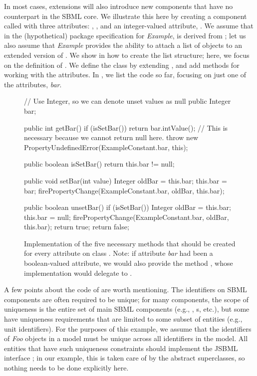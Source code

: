 In most cases, extensions will also introduce new components that have no
counterpart in the SBML core.  We illustrate this here by creating a
component called  with three attributes: , ,
and an integer-valued attribute, .  We assume that in the
(hypothetical) package specification for \emph{Example},  is
derived from \SBase; let us also assume that \emph{Example} provides the
ability to attach a list of  objects to an extended version of
\Model.  We show in  how to create the list
structure; here, we focus on the definition of .  We define the
class  by extending \AbstractSBasePlugin, and add methods for
working with the attributes.  In ,
we list the code so far, focusing on just one of the attributes,
\emph{bar}.

\begin{figure}[hbt]
  \begin{example}[numbers=left]
// Use Integer, so we can denote unset values as null public Integer bar;

public int getBar() {
  if (isSetBar()) {
    return bar.intValue();
  }
  // This is necessary because we cannot return null here.
  throw new PropertyUndefinedError(ExampleConstant.bar, this);
}

public boolean isSetBar() {
  return this.bar != null;
}

public void setBar(int value) {
  Integer oldBar = this.bar;
  this.bar = bar;
  firePropertyChange(ExampleConstant.bar, oldBar, this.bar);
}

public boolean unsetBar() {
  if (isSetBar()) {
    Integer oldBar = this.bar;
    this.bar = null;
    firePropertyChange(ExampleConstant.bar, oldBar, this.bar);
    return true;
  }
  return false;
}\end{example}
  \caption{Implementation of the five necessary methods that should be
    created for every attribute on class .  Note: if attribute
    \emph{bar} had been a boolean-valued attribute, we would also provide
    the method , whose implementation would delegate to
    .}
  \label{lst:DefaultModelExtFooBar}
\end{figure}

A few points about the code of  are worth
mentioning.  The identifiers on SBML components are often required to be
unique; for many components, the scope of uniqueness is the entire set of
main SBML components (e.g., \Species, \Compartment{}s, etc.), but some have
uniqueness requirements that are limited to some subset of entities (e.g.,
unit identifiers).  For the purposes of this example, we assume that the
identifiers of \emph{Foo} objects in a model must be unique across all
identifiers in the model.  All entities that have such uniqueness constraints
should implement the JSBML interface \UniqueNamedSBase; in our example, this
is taken care of by the abstract superclasses, so nothing needs to be done
explicitly here.

